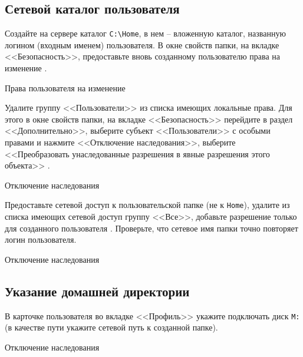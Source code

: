 \subsection{Сетевой каталог пользователя}

Создайте на сервере каталог \verb|C:\Home|,
в нем -- вложенную каталог, названную логином (входным именем) пользователя.
В окне свойств папки, на вкладке <<Безопасность>>,
предоставьте вновь созданному пользователю права
на изменение .

\begin{image}
	\caption{Права пользователя на изменение}
	\label{fig:user:prop}
\end{image}

Удалите группу <<Пользователи>> из списка имеющих локальные права.
Для этого в окне свойств папки,
на вкладке <<Безопасность>> перейдите в раздел <<Дополнительно>>,
выберите субъект <<Пользователи>> с особыми правами
и нажмите <<Отключение наследования>>, выберите
<<Преобразовать унаследованные разрешения в явные разрешения этого объекта>>
.

\begin{image}
	\caption{Отключение наследования}
	\label{fig:user:dir:disabiling:inheritance}
\end{image}

Предоставьте сетевой доступ к пользовательской папке (не к \texttt{Home}),
удалите из списка имеющих сетевой доступ группу <<Все>>,
добавьте разрешение только для созданного пользователя
.
Проверьте, что сетевое имя папки точно повторяет логин пользователя.

\begin{image}
	\caption{Отключение наследования}
	\label{fig:user:dir:net:share}
\end{image}

\subsection{Указание домашней директории}

В карточке  пользователя во вкладке <<Профиль>>
укажите подключать диск \texttt{М:}
(в качестве пути укажите сетевой путь к созданной папке).

\begin{image}
	\caption{Отключение наследования}
	\label{fig:user:profile}
\end{image}

